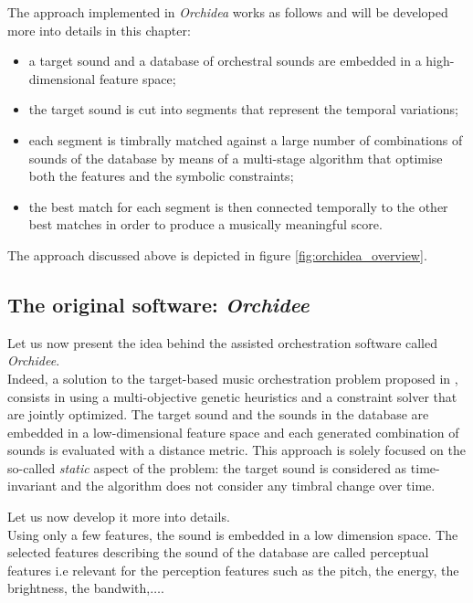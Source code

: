 \documentclass[a4paper]{book}
\begin{document}
The approach implemented in \textit{Orchidea} works as follows and will be developed more into details in this chapter:
\begin{itemize}
	\item a target sound and a database of orchestral sounds are embedded in a high-dimensional feature space;
	\item the target sound is cut into segments that represent the temporal variations;
	\item each segment is timbrally matched against a large number of combinations of sounds of the database
	by means of a multi-stage algorithm that optimise both the features and the symbolic constraints;
	\item the best match for each segment is then connected temporally to the other best matches in order to produce a musically meaningful score.
\end{itemize}



The approach discussed above is depicted in figure \ref{fig:orchidea_overview}.





\subsection{The original software: \textit{Orchidee}}%

Let us now present the idea behind the assisted orchestration software called \textit{Orchidee}.\\
Indeed, a solution to the target-based music orchestration problem proposed in \cite{carpentier2007evolutionary}, consists in using a multi-objective genetic heuristics and a constraint solver that are jointly optimized. The target sound and the sounds in the database are embedded in a low-dimensional feature space and each generated combination of sounds is evaluated with a distance metric. 
This approach is solely focused on the so-called \emph{static} aspect of the problem: the target sound is considered as time-invariant and the algorithm does not consider any timbral change over time.

Let us now develop it more into details.\\
Using only a few features, the sound is embedded in a low dimension space. The selected features describing the sound of the database are called perceptual features i.e relevant for the perception features such as the pitch, the energy, the brightness, the bandwith,$\ldots$. \\
\end{document}
